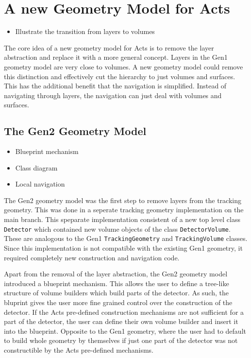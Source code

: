 \section{A new Geometry Model for Acts}

\begin{itemize}
    \color{red}
    \item Illustrate the transition from layers to volumes
\end{itemize}

The core idea of a new geometry model for Acts is to remove the layer abstraction and replace it with a more general concept. Layers in the Gen1 geometry model are very close to volumes. A new geometry model could remove this distinction and effectively cut the hierarchy to just volumes and surfaces. This has the additional benefit that the navigation is simplified. Instead of navigating through layers, the navigation can just deal with volumes and surfaces.

\subsection{The Gen2 Geometry Model}

\begin{itemize}
    \color{red}
    \item Blueprint mechanism
    \item Class diagram
    \item Local navigation
\end{itemize}

The Gen2 geometry model was the first step to remove layers from the tracking geometry. This was done in a seperate tracking geometry implementation on the main branch. This speparate implementation consistent of a new top level class \texttt{Detector} which contained new volume objects of the class \texttt{DetectorVolume}. These are analogous to the Gen1 \texttt{TrackingGeometry} and \texttt{TrackingVolume} classes. Since this implementation is not compatible with the existing Gen1 geometry, it required completely new construction and navigation code.

Apart from the removal of the layer abstraction, the Gen2 geometry model introduced a blueprint mechanism. This allows the user to define a tree-like structure of volume builders which build parts of the detector. As such, the bluprint gives the user more fine grained control over the construction of the detector. If the Acts pre-defined construction mechanisms are not sufficient for a part of the detector, the user can define their own volume builder and insert it into the blueprint. Opposite to the Gen1 geometry, where the user had to default to build whole geometry by themselves if just one part of the detector was not constructible by the Acts pre-defined mechanisms.

